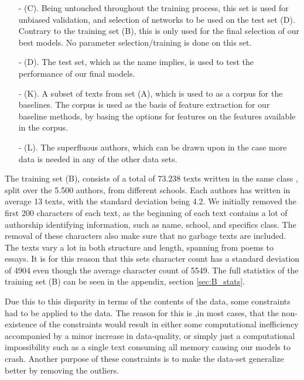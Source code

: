 \begin{itemize}
\begin{itemize}
\begin{itemize}
\end{itemize}


\item[- (C).]
Being untouched throughout the training process, this set is used for unbiased
validation, and selection of networks to be used on the test set (D). Contrary
to the training set (B), this is only used for the final selection of our best 
models. No parameter selection/training is done on this set.


\item[- (D).]
The test set, which as the name implies, is used to test the
performance of our final models.

\item[- (K).]
A subset of texts from set (A),  which is used to as a corpus for the baselines.
The corpus is used as the basis of feature extraction for our baseline methods,
by basing the options for features on the features available in the corpus.

\item[- (L).]
The superfluous authors, which can be drawn upon in the case more data is needed
in any of the other data sets.

\end{itemize}

\end{itemize}

The training set (B), consists of a total of 73.238 texts written in the same
class , split over the 5.500 authors, from different schools. Each authors has
written in average 13 texts, with the standard deviation being 4.2. We initially
removed the first 200 characters of each text, as the beginning of each text
contains a lot of authorship identifying information, such as name, school, and
specifics class. The removal of these characters also make sure that no garbage
texts are included. The texts vary a lot in both structure and length, spanning
from poems to essays. It is for this reason that this sets character count has
a standard deviation of 4904 even though the average character count of 5549.
The full statistics of the training set (B) can be seen in the appendix, section
\ref{sec:B_stats}.

Due this to this disparity in terms of the contents of the data, some
constraints had to be applied to the data. The reason for this is ,in most
cases, that the non-existence of the constraints would result in either some
computational inefficiency accompanied by a minor increase in data-quality, or
simply just a computational impossibility such as a single text consuming all
memory causing our models to crash. Another purpose of these constraints is to
make the data-set generalize better by removing the outliers.

